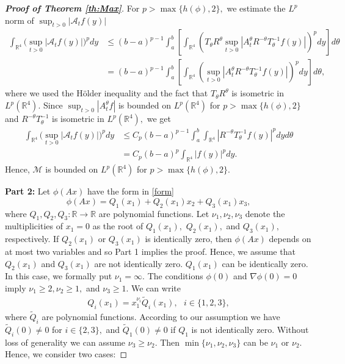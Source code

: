 \documentclass[a4paper, 11pt]{article}
\theoremstyle{plain}
\theoremstyle{definition}
\theoremstyle{lemma}
\theoremstyle{Remark}
\theoremstyle{proposition}
\theoremstyle{corollary}
\theoremstyle{example}
\theoremstyle{assumption}
\begin{document}
\begin{proof}[\textbf{Proof of Theorem \ref{th:Max}}]
 For $p>\max\{h(\phi),2\},$ we estimate the $L^p$ norm of $\sup_{t>0}|\mathcal{A}_t f(y)|$
  \begin{align*}\int_{\mathbb{R}^4}\big(\sup_{t>0}|\mathcal{A}_tf(y)| \big)^pdy & \leq (b-a)^{p-1}
 \int_a^b\left[ \int_{\mathbb{R}^4}
 \left(T_{\theta}R^{\theta}
 \sup_{t>0}| {A}_t^{\theta}R^{-
 \theta}T_{\theta}^{-1} f(y)|
 \right)^pdy\right]d\theta\\
 &=(b-a)^{p-1}
 \int_a^b\left[ \int_{\mathbb{R}^4}
 \left(
 \sup_{t>0}| {A}_t^{\theta}R^{-
 \theta}T_{\theta}^{-1} f(y)|
 \right)^pdy\right]d\theta, \end{align*}
where we used  the H\"older inequality and the fact that $T_{\theta}R^{\theta}$ is isometric  in $L^p(\mathbb{R}^4).$ Since $\sup_{t>0}|{A}_t^{\theta}f|$ is bounded on $L^p(\mathbb{R}^4)$ for $p> \max\{h(\phi), 2\}$ and $R^{-
 \theta}T_{\theta}^{-1}$ is isometric in $L^p(\mathbb{R}^4),$ we get
 \begin{align*}\int_{\mathbb{R}^4}\big(\sup_{t>0}|\mathcal{A}_tf(y)| \big)^pdy & \leq C_p(b-a)^{p-1}
\int_a^b \int_{\mathbb{R}^4}
 |R^{-
 \theta}T_{\theta}^{-1} f(y)|^pdyd\theta\\
 &=C_p(b-a)^{p}
  \int_{\mathbb{R}^4}
| f(y)|^pdy.
 \end{align*}
 Hence, $\mathcal{M}$ is bounded on $L^p(\mathbb{R}^4)$ for $p> \max\{h(\phi),2\}.$


\bigskip
\textbf{Part 2:} Let
$ \phi(Ax)$ have the form in \eqref{form}
$$\phi(Ax)=Q_1(x_1)+Q_2(x_1)x_2+Q_3(x_1)x_3,$$
where $Q_1, Q_2, Q_3:\mathbb{R}\to \mathbb{R}$ are polynomial functions.
 Let $\nu_1,\nu_2,\nu_3$  denote the multiplicities of $x_1=0$ as the root of $Q_1(x_1),$ $Q_2(x_1),$ and $Q_3(x_1),$ respectively. If  $Q_2(x_1)$ or  $Q_3(x_1)$ is identically zero, then $\phi(Ax)$ depends on at most two variables and so Part 1  implies the proof. Hence, we assume that $Q_2(x_1)$ and $Q_3(x_1)$ are not identically zero. $Q_1(x_1)$ can be identically zero. In this case, we formally put $\nu_1=\infty$.
  The conditions $\phi(0)$ and $\nabla \phi(0)=0$ imply $\nu_1\geq 2, \nu_2\geq 1,$ and $\nu_3\geq 1.$  We can write
\begin{eqnarray*}
Q_i(x_1)=x_1^{\nu_i}\tilde Q_i(x_1),\,\,\,\,i\in \{1,2,3\},
\end{eqnarray*}
where $\tilde Q_i$ are  polynomial functions. According to our assumption we have $\tilde Q_i(0)\neq 0$    for $i\in \{2,3\},$ and $\tilde Q_1(0)\neq 0$  if  $Q_1$ is not identically zero.
Without loss of generality we can assume $\nu_3\geq \nu_2.$  Then  $\min\{\nu_1,\nu_2,\nu_3\}$  can be $\nu_1$ or $\nu_2.$
Hence, we consider two  cases:



\end{proof}
\end{document}
